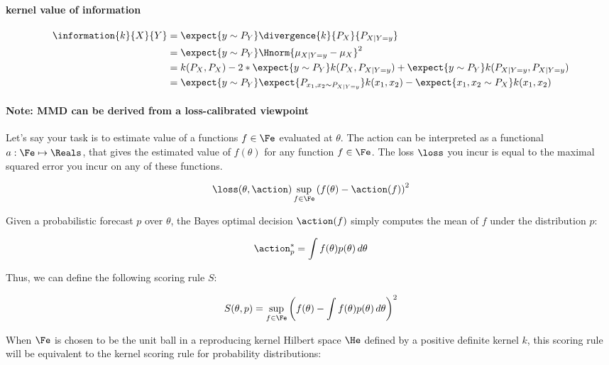 \paragraph{kernel value of information}

\begin{align}
	\information{k}{X}{Y} &= \expect{y\sim P_{Y}} \divergence{k}{P_{X}}{P_{X\vert Y=y}}\\
		&=  \expect{y\sim P_{Y}} \Hnorm{ \mu_{X \vert Y=y} - \mu_X }^2\\
		&= k(P_{X},P_{X}) - 2*\expect{y\sim P_{Y}}k(P_{X},P_{X\vert Y=y}) + \expect{y\sim P_{Y}} k(P_{X\vert Y=y},P_{X\vert Y=y})\\
		&= \expect{y\sim P_{Y}} \expect{P_{x_1,x_2 \sim P_{X\vert Y=y}}}k(x_1,x_2) - \expect{x_1,x_2\sim P_{X}}k(x_1,x_2)
\end{align}


\paragraph{Note: MMD can be derived from a loss-calibrated viewpoint}

Let's say your task is to estimate value of a functions $f\in{\Fe}$ evaluated at $\theta$. The action can be interpreted as a functional $a:\Fe\mapsto\Reals$, that gives the estimated value of $f(\theta)$ for any function $f\in\Fe$. The loss $\loss$ you incur is equal to the maximal squared error you incur on any of these functions.

\begin{equation}
\loss(\theta, \action) \sup_{f\in\Fe}\left( f(\theta) - \action(f)\right)^2
\end{equation}

Given a probabilistic forecast $p$ over $\theta$, the Bayes optimal decision $\action(f)$ simply computes the mean of $f$ under the distribution $p$:

\begin{equation}
 \action^{*}_{p} = \int f(\theta)p(\theta)\,d\theta
\end{equation}

Thus, we can define the following scoring rule $S$:

\begin{equation}
	S(\theta,p) = \sup_{f\in\Fe}\left( f(\theta) - \int f(\theta)p(\theta)\,d\theta \right)^2
\end{equation}

When $\Fe$ is chosen to be the unit ball in a reproducing kernel Hilbert space $\He$ defined by a positive definite kernel $k$, this scoring rule will be equivalent to the kernel scoring rule for probability distributions:


